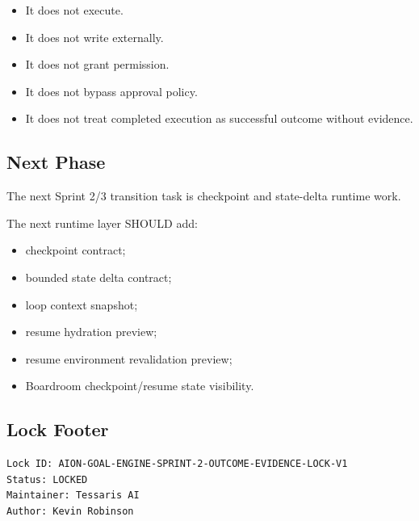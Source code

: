 \begin{itemize}
  \item It does not execute.
  \item It does not write externally.
  \item It does not grant permission.
  \item It does not bypass approval policy.
  \item It does not treat completed execution as successful outcome without evidence.
\end{itemize}

\subsection{Next Phase}

The next Sprint 2/3 transition task is checkpoint and state-delta runtime work.

The next runtime layer SHOULD add:

\begin{itemize}
  \item checkpoint contract;
  \item bounded state delta contract;
  \item loop context snapshot;
  \item resume hydration preview;
  \item resume environment revalidation preview;
  \item Boardroom checkpoint/resume state visibility.
\end{itemize}

\subsection{Lock Footer}

\begin{verbatim}
Lock ID: AION-GOAL-ENGINE-SPRINT-2-OUTCOME-EVIDENCE-LOCK-V1
Status: LOCKED
Maintainer: Tessaris AI
Author: Kevin Robinson
\end{verbatim}
